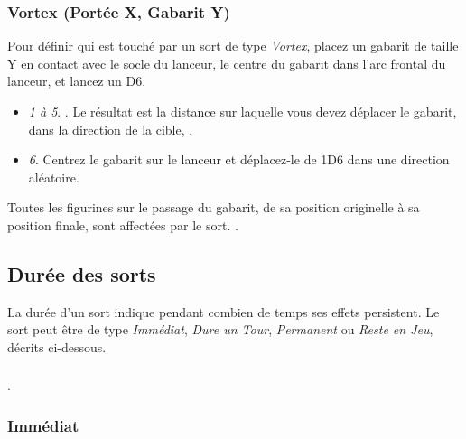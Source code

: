 \subsubsection*{Vortex (Portée X{\pouce}, Gabarit Y{\pouce})}

Pour définir qui est touché par un sort de type \emph{Vortex}, placez un gabarit de taille Y{\pouce} en contact avec le socle du lanceur, le centre du gabarit dans l'arc frontal du lanceur, et lancez un D6.
\begin{itemize}[label={-}]
\item \emph{1 à 5}. . Le résultat est la distance sur laquelle vous devez déplacer le gabarit, dans la direction de la cible, .
\item \emph{6}. Centrez le gabarit sur le lanceur et déplacez-le de 1D6{\pouce} dans une direction aléatoire.
\end{itemize}

Toutes les figurines sur le passage du gabarit, de sa position originelle à sa position finale, sont affectées par le sort. .

\subsection{Durée des sorts}

La durée d'un sort indique pendant combien de temps ses effets persistent. Le sort peut être de type \emph{Immédiat}, \emph{Dure un Tour}, \emph{Permanent} ou \emph{Reste en Jeu}, décrits ci-dessous.

\subsubsection*{}

.

\subsubsection*{Immédiat}


